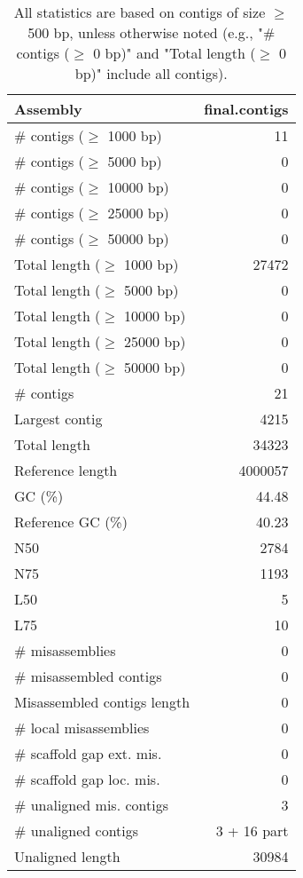 \documentclass[12pt,a4paper]{article}
\begin{document}
\begin{table}[ht]
\begin{center}
\caption{All statistics are based on contigs of size $\geq$ 500 bp, unless otherwise noted (e.g., "\# contigs ($\geq$ 0 bp)" and "Total length ($\geq$ 0 bp)" include all contigs).}
\begin{tabular}{|l*{1}{|r}|}
\hline
Assembly & final.contigs \\ \hline
\# contigs ($\geq$ 1000 bp) & 11 \\ \hline
\# contigs ($\geq$ 5000 bp) & 0 \\ \hline
\# contigs ($\geq$ 10000 bp) & 0 \\ \hline
\# contigs ($\geq$ 25000 bp) & 0 \\ \hline
\# contigs ($\geq$ 50000 bp) & 0 \\ \hline
Total length ($\geq$ 1000 bp) & 27472 \\ \hline
Total length ($\geq$ 5000 bp) & 0 \\ \hline
Total length ($\geq$ 10000 bp) & 0 \\ \hline
Total length ($\geq$ 25000 bp) & 0 \\ \hline
Total length ($\geq$ 50000 bp) & 0 \\ \hline
\# contigs & 21 \\ \hline
Largest contig & 4215 \\ \hline
Total length & 34323 \\ \hline
Reference length & 4000057 \\ \hline
GC (\%) & 44.48 \\ \hline
Reference GC (\%) & 40.23 \\ \hline
N50 & 2784 \\ \hline
N75 & 1193 \\ \hline
L50 & 5 \\ \hline
L75 & 10 \\ \hline
\# misassemblies & 0 \\ \hline
\# misassembled contigs & 0 \\ \hline
Misassembled contigs length & 0 \\ \hline
\# local misassemblies & 0 \\ \hline
\# scaffold gap ext. mis. & 0 \\ \hline
\# scaffold gap loc. mis. & 0 \\ \hline
\# unaligned mis. contigs & 3 \\ \hline
\# unaligned contigs & 3 + 16 part \\ \hline
Unaligned length & 30984 \\ \hline

\end{tabular}
\end{center}
\end{table}
\end{document}
